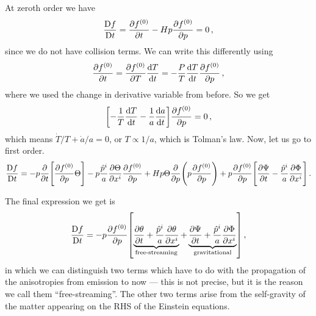 \documentclass[main.tex]{subfiles}
\begin{document}
At zeroth order we have 
%
\begin{align}
\frac{\mathrm{D}f}{\mathrm{D}t} = \pdv{f^{(0)}}{t}
- Hp \pdv{f^{(0)}}{p} =0
\,,
\end{align}
%
since we do not have collision terms. We can write this differently using 
%
\begin{align}
\pdv{f^{(0)}}{t} = \pdv{f^{(0)}}{T} \dv{T}{t} = - \frac{P}{T} \dv{T}{t} \pdv{f^{(0)}}{p}
\,,
\end{align}
%
where we used the change in derivative variable from before. So we get 
%
\begin{align}
\qty[- \frac{1}{T} \dv{T}{t} - \frac{1}{a} \dv{a}{t}] \pdv{f^{(0)}}{p} =0
\,,
\end{align}
%
which means \(\dot{T} / T + \dot{a} / a = 0\), or \(T \propto 1/a\), which is Tolman's law. Now, let us go to first order. 
%
\begin{align}
\bigd{f}{t}
= -p \pdv{}{t} \qty[\pdv{f^{(0)}}{p} \Theta ] - p \frac{\hat{p}^{i}}{a} \pdv{\Theta }{x^{i}} \pdv{f^{(0)}}{p}
+ H p \Theta  \pdv{}{p} \qty(p \pdv{f^{(0)}}{p}) 
+ p \pdv{f^{(0)}}{p} \qty[\pdv{\Psi }{t} - \frac{\hat{p}^{i}}{a} \pdv{\Phi }{x^{i}}]
\,.
\end{align}

The final expression we get is 
%
\begin{align}
\bigd{f}{t} = - p \pdv{f^{(0)}}{p}
\qty[
\underbrace{\pdv{\theta }{t} + \frac{\hat{p}^{i}}{a} \pdv{\theta }{x^{i}}}_{\text{free-streaming}}
+ \underbrace{\pdv{\Psi }{t} + \frac{\hat{p}^{i}}{a} \pdv{\Phi}{x^{i}}}_{\text{gravitational}}
]
\,,
\end{align}
%
in which we can distinguish two terms which have to do with the propagation of the anisotropies from emission to now --- this is not precise, but it is the reason we call them ``free-streaming''. 
The other two terms arise from the self-gravity of the matter appearing on the RHS of the Einstein equations. 
\end{document}
